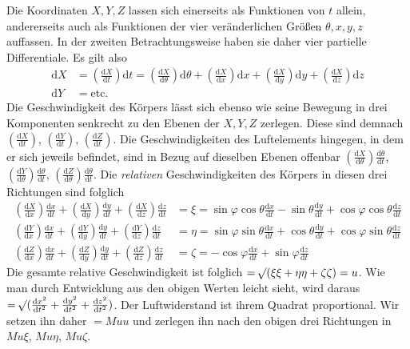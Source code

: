 Die Koordinaten $X,Y,Z$ lassen sich einerseits als Funktionen von $t$ allein, andererseits auch als Funktionen der vier veränderlichen Größen $\theta,x,y,z$ auffassen. In der zweiten Betrachtungsweise haben sie daher vier partielle Differentiale. Es gilt also
\[
\begin{aligned}
\mathrm{d}X&=(\tfrac{\mathrm{d}X}{\mathrm{d}t})\mathrm{d}t=(\tfrac{\mathrm{d}X}{\mathrm{d}\theta})\mathrm{d}\theta+(\tfrac{\mathrm{d}X}{\mathrm{d}x})\mathrm{d}x+(\tfrac{\mathrm{d}X}{\mathrm{d}y})\mathrm{d}y+(\tfrac{\mathrm{d}X}{\mathrm{d}z})\mathrm{d}z\\
\mathrm{d}Y&=\mathrm{etc.}
\end{aligned}
\]
Die Geschwindigkeit des Körpers lässt sich ebenso wie seine Bewegung in drei Komponenten senkrecht zu den Ebenen der $X,Y,Z$ zerlegen. Diese sind demnach $(\tfrac{\mathrm{d}X}{\mathrm{d}t})$, $(\tfrac{\mathrm{d}Y}{\mathrm{d}t})$, $(\tfrac{\mathrm{d}Z}{\mathrm{d}t})$. Die Geschwindigkeiten des Luftelements hingegen, in dem er sich jeweils befindet, sind in Bezug auf dieselben Ebenen offenbar $(\tfrac{\mathrm{d}X}{\mathrm{d}\theta})\tfrac{\mathrm{d}\theta}{\mathrm{d}t}$, $(\tfrac{\mathrm{d}Y}{\mathrm{d}\theta})\tfrac{\mathrm{d}\theta}{\mathrm{d}t}$, $(\tfrac{\mathrm{d}Z}{\mathrm{d}\theta})\tfrac{\mathrm{d}\theta}{\mathrm{d}t}$. Die \textit{relativen} Geschwindigkeiten des Körpers in diesen drei Richtungen sind folglich
\[
\begin{aligned}
(\tfrac{\mathrm{d}X}{\mathrm{d}x})\tfrac{\mathrm{d}x}{\mathrm{d}t}+(\tfrac{\mathrm{d}X}{\mathrm{d}y})\tfrac{\mathrm{d}y}{\mathrm{d}t}+(\tfrac{\mathrm{d}X}{\mathrm{d}z})\tfrac{\mathrm{d}z}{\mathrm{d}t}&=\xi=\sin\varphi\cos\theta\tfrac{\mathrm{d}x}{\mathrm{d}t}-\sin\theta\tfrac{\mathrm{d}y}{\mathrm{d}t}+\cos\varphi\cos\theta\tfrac{\mathrm{d}z}{\mathrm{d}t}\\
(\tfrac{\mathrm{d}Y}{\mathrm{d}x})\tfrac{\mathrm{d}x}{\mathrm{d}t}+(\tfrac{\mathrm{d}Y}{\mathrm{d}y})\tfrac{\mathrm{d}y}{\mathrm{d}t}+(\tfrac{\mathrm{d}Y}{\mathrm{d}z})\tfrac{\mathrm{d}z}{\mathrm{d}t}&=\eta=\sin\varphi\sin\theta\tfrac{\mathrm{d}x}{\mathrm{d}t}+\cos\theta\tfrac{\mathrm{d}y}{\mathrm{d}t}+\cos\varphi\sin\theta\tfrac{\mathrm{d}z}{\mathrm{d}t}\\
(\tfrac{\mathrm{d}Z}{\mathrm{d}x})\tfrac{\mathrm{d}x}{\mathrm{d}t}+(\tfrac{\mathrm{d}Z}{\mathrm{d}y})\tfrac{\mathrm{d}y}{\mathrm{d}t}+(\tfrac{\mathrm{d}Z}{\mathrm{d}z})\tfrac{\mathrm{d}z}{\mathrm{d}t}&=\zeta=-\cos\varphi\tfrac{\mathrm{d}x}{\mathrm{d}t}+\sin\varphi\tfrac{\mathrm{d}z}{\mathrm{d}t}
\end{aligned}
\]
Die gesamte relative Geschwindigkeit ist folglich $=\mathord{{}^{}\!\surd}(\xi\xi+\eta\eta+\zeta\zeta)=u$. Wie man durch Entwicklung aus den obigen Werten leicht sieht, wird daraus $=\mathord{{}^{}\!\surd}(\tfrac{\mathrm{d}x^2}{\mathrm{d}t^2}+\tfrac{\mathrm{d}y^2}{\mathrm{d}t^2}+\tfrac{\mathrm{d}z^2}{\mathrm{d}t^2})$. Der Luftwiderstand ist ihrem Quadrat proportional. Wir setzen ihn daher $=Muu$ und zerlegen ihn nach den obigen drei Richtungen in $Mu\xi$, $Mu\eta$, $Mu\zeta$.

